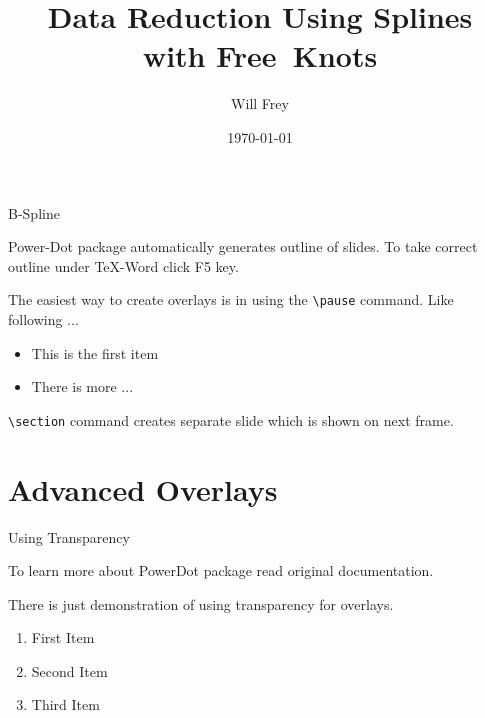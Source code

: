 \documentclass[style=sailor,size=14pt,display=slidesnotes]{powerdot}
\begin{document}
\title{Data Reduction Using Splines\\ with Free\ Knots}
\author{Will Frey}
\date{\today}
\maketitle

\begin{slide}{B-Spline}

  Power-Dot package automatically generates outline of slides.
  To take correct outline under \TeX-Word click F5 key.

  The easiest way to create overlays is in using 
  the \texttt{\textbackslash pause} command.
  Like following ...

  \begin{itemize}
    \item This is the first item\pause
    \item There is more ...
  \end{itemize}

  \texttt{\textbackslash section} command creates separate slide 
  which is shown on next frame.

\end{slide}

\section{Advanced Overlays}

\begin{slide}{Using Transparency}

  To learn more about PowerDot package 
  read original documentation.

  There is just demonstration of using transparency 
  for overlays.

  \begin{enumerate}[type=1]
    \item<1> First Item
    \item<2> Second Item
    \item<3> Third Item
  \end{enumerate}

\end{slide}
\end{document}
